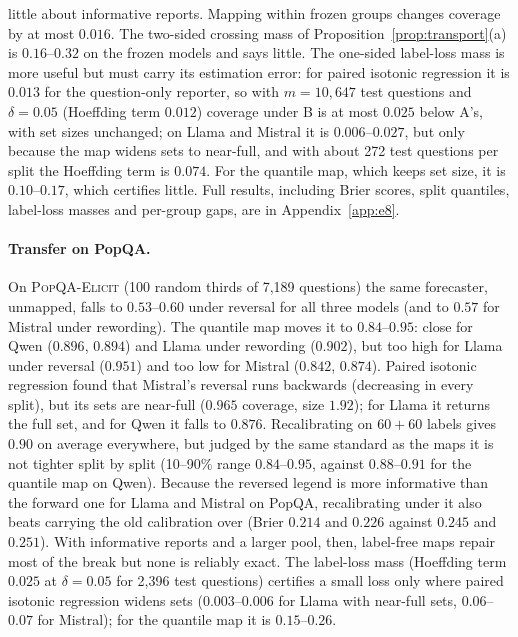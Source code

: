 \documentclass[twoside]{article}
\theoremstyle{definition}
\theoremstyle{remark}
\newcommand{\1}{\mathbf{1}}
\newcommand{\expname}[1]{\textsc{#1}}
\begin{document}
little about informative reports. Mapping within frozen groups changes coverage by at most $0.016$.
The two-sided crossing mass of Proposition~\ref{prop:transport}(a) is $0.16$--$0.32$ on the frozen models
and says little. The one-sided label-loss mass is more useful but must carry its estimation error: for
paired isotonic regression it is $0.013$ for the question-only reporter, so with $m=10{,}647$ test
questions and $\delta=0.05$ (Hoeffding term $0.012$) coverage under B is at most $0.025$ below A's, with
set sizes unchanged; on Llama and Mistral it is $0.006$--$0.027$, but only because the map widens sets
to near-full, and with about 272 test questions per split the Hoeffding term is $0.074$. For the quantile
map, which keeps set size, it is $0.10$--$0.17$, which certifies little. Full results, including Brier
scores, split quantiles, label-loss masses and per-group gaps, are in Appendix~\ref{app:e8}.

\paragraph{Transfer on PopQA.} On \expname{PopQA-Elicit} (100 random thirds of 7{,}189
questions) the same forecaster, unmapped, falls to $0.53$--$0.60$ under reversal for all three models
(and to $0.57$ for Mistral under rewording). The quantile map moves it to $0.84$--$0.95$: close for Qwen
($0.896$, $0.894$) and Llama under rewording ($0.902$), but too high for Llama under reversal ($0.951$)
and too low for Mistral ($0.842$, $0.874$). Paired isotonic regression found that Mistral's reversal
runs backwards (decreasing in every split), but its sets are near-full ($0.965$ coverage, size $1.92$);
for Llama it returns the full set, and for Qwen it falls to $0.876$. Recalibrating on $60{+}60$ labels gives
$0.90$ on average everywhere, but judged by the same standard as the maps it is not tighter split by split
(10--90\% range $0.84$--$0.95$, against $0.88$--$0.91$ for the quantile map on Qwen). Because the reversed
legend is more informative than the forward one for Llama and Mistral on PopQA, recalibrating under it also
beats carrying the old calibration over (Brier $0.214$ and $0.226$ against $0.245$ and $0.251$). With
informative reports and a larger pool, then, label-free maps repair most of the break but none is
reliably exact. The label-loss mass (Hoeffding term $0.025$ at $\delta=0.05$ for 2{,}396 test questions)
certifies a small loss only where paired isotonic regression widens sets ($0.003$--$0.006$ for Llama with
near-full sets, $0.06$--$0.07$ for Mistral); for the quantile map it is $0.15$--$0.26$.
\end{document}
